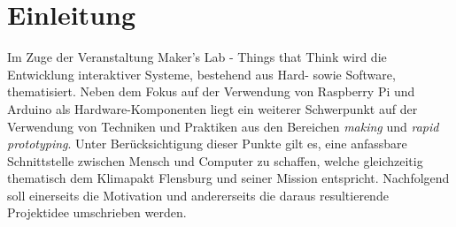 \documentclass[.../Dokumentation.tex]{subfiles}
\begin{document}
\section{Einleitung}\label{sec-intr}
Im Zuge der Veranstaltung \grqq Maker's Lab - Things that Think\grqq{} wird die 
Entwicklung interaktiver Systeme, bestehend aus Hard- sowie Software, 
thematisiert.
Neben dem Fokus auf der Verwendung von Raspberry Pi und Arduino als 
Hardware-Komponenten liegt ein weiterer Schwerpunkt auf der 
Verwendung von Techniken und Praktiken aus den Bereichen \textit{making} und 
\textit{rapid prototyping}.
Unter Berücksichtigung dieser Punkte gilt es, eine \grqq anfassbare\grqq{} Schnittstelle 
zwischen Mensch und Computer zu schaffen, welche gleichzeitig thematisch dem 
Klimapakt Flensburg und seiner Mission entspricht.
Nachfolgend soll einerseits die Motivation und andererseits die daraus 
resultierende Projektidee umschrieben werden.
\end{document}
